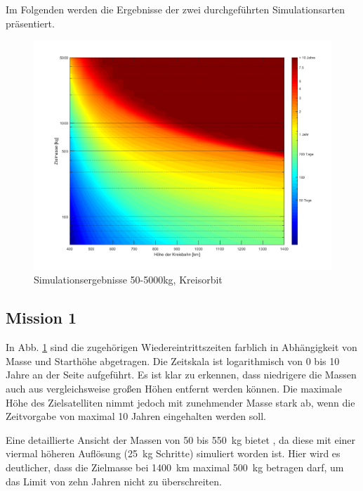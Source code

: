 	Im Folgenden werden die Ergebnisse der zwei durchgeführten Simulationsarten präsentiert.
\begin{figure}[h]
\centering
\includegraphics[width=1.00\textwidth]{./graphics/GMAT/GMAT_Mass_over_Height.png}
\caption{Simulationsergebnisse 50-5000kg, Kreisorbit}
\label{fig:GMAT_Mass_over_Height}
\end{figure}

\subsection{Mission 1}

	In Abb. \ref{fig:GMAT_Mass_over_Height} sind die zugehörigen Wiedereintrittszeiten farblich in Abhängigkeit von Masse und Starthöhe abgetragen. Die Zeitskala ist logarithmisch von \num{0} bis \num{10} Jahre an der Seite aufgeführt.  
Es ist klar zu erkennen, dass niedrigere die Massen auch aus vergleichsweise großen Höhen entfernt werden können. Die maximale Höhe des Zielsatelliten nimmt jedoch mit zunehmender Masse stark ab, wenn die Zeitvorgabe von maximal \num{10} Jahren eingehalten werden soll.

	Eine detaillierte Ansicht der Massen von \num{50} bis \SI{550}{\kilogram} bietet , da diese mit einer viermal höheren Auflösung (\SI{25}{\kilogram} Schritte) simuliert worden ist. Hier wird es deutlicher, dass die Zielmasse bei \SI{1400}{\kilo\metre} maximal \SI{500}{\kilogram} betragen darf, um das Limit von zehn Jahren nicht zu überschreiten.

